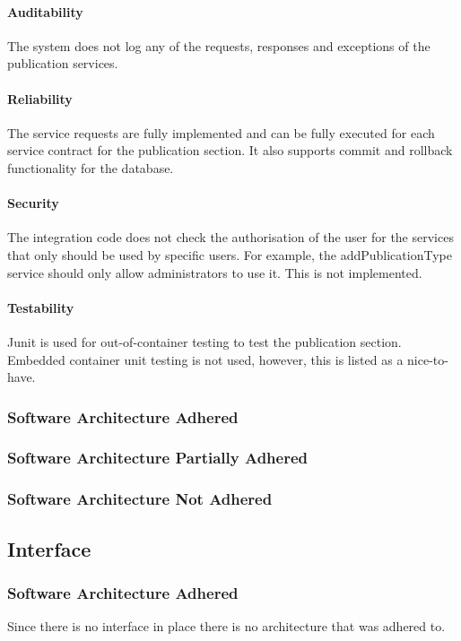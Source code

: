 \documentclass{article}
\begin{document}
            \paragraph{Auditability}
            The system does not log any of the requests, responses and exceptions of the publication services.
            
            
            \paragraph{Reliability}
            The service requests are fully implemented and can be fully executed for each service contract for the publication section. It also supports commit and rollback functionality for the database.
            
            \paragraph{Security}
            The integration code does not check the authorisation of the user for the services that only should be used by specific users. For example, the addPublicationType service should only allow administrators to use it. This is not implemented.
            
            \paragraph{Testability}
            Junit is used for out-of-container testing to test the publication section. Embedded container unit testing is not used, however, this is listed as a nice-to-have.
        \subsubsection{Software Architecture Adhered}
        \subsubsection{Software Architecture Partially Adhered}
        \subsubsection{Software Architecture Not Adhered}       
		
	\subsection{Interface}
		\subsubsection{Software Architecture Adhered}
			Since there is no interface in place there is no architecture that was adhered to.
\end{document}
